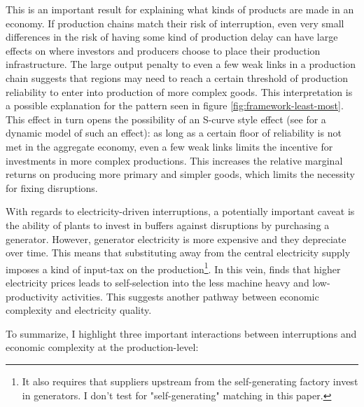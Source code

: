 \documentclass[11pt]{article}
\begin{document}
  This is an important result for explaining what kinds of products are made in an economy. If production chains match their risk of interruption, even very small differences in the risk of having some kind of production delay can have large effects on where investors and producers choose to place their production infrastructure. The large output penalty to even a few weak links in a production chain suggests that regions may need to reach a certain threshold of production reliability to enter into production of more complex goods. This interpretation is a possible explanation for the pattern seen in figure \ref{fig:framework-least-most}. This effect in turn opens the possibility of an S-curve style effect (see \cite{brummitt_contagious_2017} for a dynamic model of such an effect): as long as a certain floor of reliability is not met in the aggregate economy, even a few weak links limits the incentive for investments in more complex productions. This increases the relative marginal returns on producing more primary and simpler goods, which limits the necessity for fixing disruptions.

With regards to electricity-driven interruptions, a potentially important caveat is the ability of plants to invest in buffers against disruptions by purchasing a generator. However, generator electricity is more expensive and they depreciate over time. This means that substituting away from the central electricity supply imposes a kind of input-tax on the production\footnote{It also requires that suppliers upstream from the self-generating factory invest in generators. I don't test for "self-generating" matching in this paper.}. In this vein, \cite{abeberese_electricity_2017} finds that higher electricity prices leads to self-selection into the less machine heavy and low-productivity activities. This suggests another pathway between economic complexity and electricity quality. 

To summarize, I highlight three important interactions between interruptions and economic complexity at the production-level:
\end{document}

